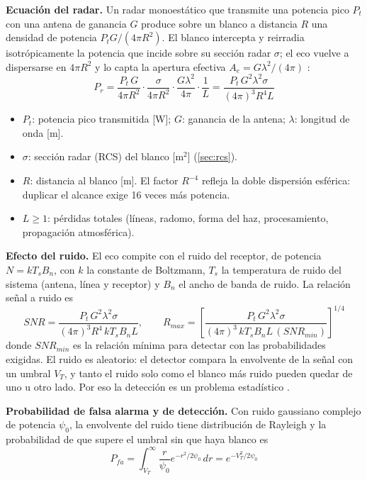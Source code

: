 \textbf{Ecuación del radar.} Un radar monoestático que transmite una potencia pico $P_t$ con una antena de ganancia $G$ produce sobre un blanco a distancia $R$ una densidad de potencia $P_t G / (4\pi R^2)$. El blanco intercepta y reirradia isotrópicamente la potencia que incide sobre su sección radar $\sigma$; el eco vuelve a dispersarse en $4\pi R^2$ y lo capta la apertura efectiva $A_e = G\lambda^2/(4\pi)$ \cite{skolnik, apunte}:
\begin{equation}
    P_r = \frac{P_t \, G}{4\pi R^2} \cdot \frac{\sigma}{4\pi R^2} \cdot \frac{G \lambda^2}{4\pi} \cdot \frac{1}{L} = \frac{P_t \, G^2 \lambda^2 \sigma}{(4\pi)^3 R^4 L}
    \label{eq:radar}
\end{equation}
\begin{itemize}
    \item $P_t$: potencia pico transmitida [W]; $G$: ganancia de la antena; $\lambda$: longitud de onda [m].
    \item $\sigma$: sección radar (RCS) del blanco [m$^2$] (\autoref{sec:rcs}).
    \item $R$: distancia al blanco [m]. El factor $R^{-4}$ refleja la doble dispersión esférica: duplicar el alcance exige 16 veces más potencia.
    \item $L \geq 1$: pérdidas totales (líneas, radomo, forma del haz, procesamiento, propagación atmosférica).
\end{itemize}

\textbf{Efecto del ruido.} El eco compite con el ruido del receptor, de potencia $N = k T_s B_n$, con $k$ la constante de Boltzmann, $T_s$ la temperatura de ruido del sistema (antena, línea y receptor) y $B_n$ el ancho de banda de ruido. La relación señal a ruido es
\begin{equation}
    SNR = \frac{P_t \, G^2 \lambda^2 \sigma}{(4\pi)^3 R^4 \, k T_s B_n L},
    \qquad
    R_{max} = \left[ \frac{P_t \, G^2 \lambda^2 \sigma}{(4\pi)^3 \, k T_s B_n L \, (SNR_{min})} \right]^{1/4}
    \label{eq:snr}
\end{equation}
donde $SNR_{min}$ es la relación mínima para detectar con las probabilidades exigidas. El ruido es aleatorio: el detector compara la envolvente de la señal con un umbral $V_T$, y tanto el ruido solo como el blanco más ruido pueden quedar de uno u otro lado. Por eso la detección es un problema estadístico \cite{richards}.

\textbf{Probabilidad de falsa alarma y de detección.} Con ruido gaussiano complejo de potencia $\psi_0$, la envolvente del ruido tiene distribución de Rayleigh y la probabilidad de que supere el umbral sin que haya blanco es \cite{skolnik, richards}
\begin{equation}
    P_{fa} = \int_{V_T}^{\infty} \frac{r}{\psi_0} e^{-r^2/2\psi_0} \, dr = e^{-V_T^2 / 2\psi_0}
\end{equation}

